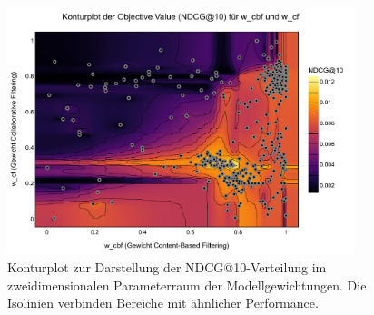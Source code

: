 
\begin{figure}[htbp]
    \centering
    \includegraphics[width=0.9\textwidth]{content/figures/svg/kontourplot.pdf}
    \caption{Konturplot zur Darstellung der NDCG@10-Verteilung im zweidimensionalen Parameterraum der Modellgewichtungen. Die Isolinien verbinden Bereiche mit ähnlicher Performance.}
    \label{fig:kontourplot}
\end{figure}